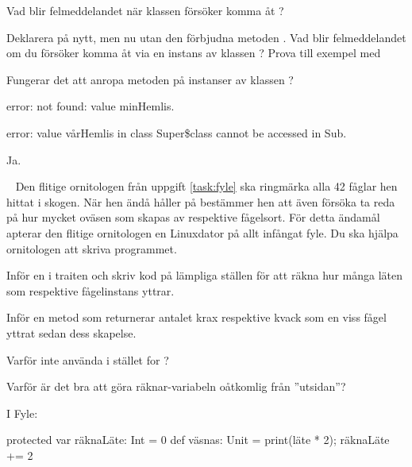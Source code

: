 \Subtask Vad blir felmeddelandet när klassen  försöker komma åt ?

\Subtask Deklarera  på nytt, men nu utan den förbjudna metoden . Vad blir felmeddelandet om du försöker komma åt  via en instans av klassen ? Prova till exempel med 

\Subtask Fungerar det att anropa metoden  på instanser av klassen ?

\SOLUTION


\TaskSolved \what


\SubtaskSolved  error: not found: value minHemlis.

\SubtaskSolved  error: value vårHemlis in class Super\$class cannot be accessed in Sub.

\SubtaskSolved  Ja.


\QUESTEND







\QUESTBEGIN

\Task  \what~  Den flitige ornitologen från uppgift \ref{task:fyle} ska ringmärka alla 42 fåglar hen hittat i skogen. När hen ändå håller på bestämmer hen att även försöka ta reda på hur mycket oväsen som skapas av respektive fågelsort. För detta ändamål apterar den flitige ornitologen en Linuxdator på allt infångat fyle. Du ska hjälpa ornitologen att skriva programmet.

\Subtask Inför en  i traiten  och skriv kod på lämpliga ställen för att räkna hur många läten som respektive fågelinstans yttrar.

\Subtask Inför en metod  som returnerar antalet krax respektive kvack som en viss fågel yttrat sedan dess skapelse.

\Subtask Varför inte använda  i stället for ?

\Subtask Varför är det bra att göra räknar-variabeln oåtkomlig från ''utsidan''?



\SOLUTION


\TaskSolved \what


\SubtaskSolved  I Fyle:
\begin{Code}
protected var räknaLäte: Int = 0
def väsnas: Unit = { print(läte * 2); räknaLäte += 2 }
\end{Code}

